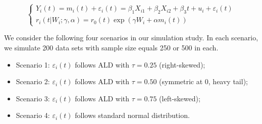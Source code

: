 \begin{equation}\label{eqn:p2simjoint}
\left\{
\begin{array}{l}
Y_{i}(t) = m_i(t) + \varepsilon_{i}(t) = \beta_1X_{i1} + \beta_2X_{i2} + \beta_3t + u_i + \varepsilon_{i}(t)\\
r_i(t|W_i;  \gamma, \alpha) = r_0(t)\exp(\gamma W_i + \alpha m_i(t))
\end{array}
\right.
\end{equation}


We consider the following four scenarios in our simulation study. In each scenario, we simulate 200 data sets with sample size equals 250 or 500 in each.
\begin{itemize}
\item Scenario 1: $\varepsilon_{i}(t)$ follows ALD with $\tau=0.25$ (right-skewed);
\item Scenario 2: $\varepsilon_{i}(t)$ follows ALD with $\tau=0.50$ (symmetric at 0, heavy tail);
\item Scenario 3: $\varepsilon_{i}(t)$ follows ALD with $\tau=0.75$ (left-skewed);
\item Scenario 4: $\varepsilon_{i}(t)$ follows standard normal distribution.
\end{itemize}

